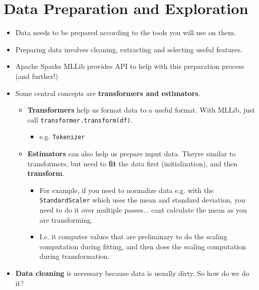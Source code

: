 
\section{Data Preparation and Exploration}
\begin{multicols}{2}
\begin{itemize}
\item
  Data needs to be prepared according to the tools you will use on them.
\item
  Preparing data involves cleaning, extracting and selecting useful
  features.
\item
  Apache Spark\textquotesingle s MLLib provides API to help with this
  preparation process (and further!)
\item
  Some central concepts are \textbf{transformers and estimators}.

  \begin{itemize}
    \item
    \textbf{Transformers} help us format data to a useful format. With
    MLLib, just call \texttt{transformer.transform(df)}.

    \begin{itemize}
        \item
      e.g. \texttt{Tokenizer}
    \end{itemize}
  \item
    \textbf{Estimators} can also help us prepare input data.
    They\textquotesingle re similar to transformers, but need to
    \textbf{fit} the data first (initialization), and then
    \textbf{transform}.

    \begin{itemize}
        \item
      For example, if you need to normalize data e.g. with the
      \texttt{StandardScaler} which uses the mean and standard
      deviation, you need to do it over multiple passes...
      can\textquotesingle t calculate the mean as you are transforming.
    \item
      I.e. it computes values that are preliminary to do the scaling
      computation during fitting, and then does the scaling computation
      during transformation.
    \end{itemize}
  \end{itemize}
\item
  \textbf{Data cleaning} is necessary because data is usually dirty. So
  how do we do it?


\end{itemize}
\end{multicols}
